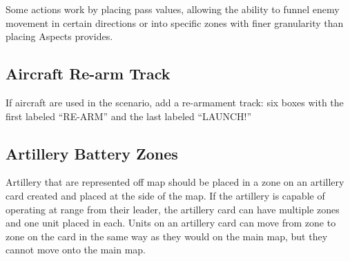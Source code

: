 Some actions work by placing pass values, allowing the ability to funnel enemy movement in certain directions or into specific zones with finer granularity than placing Aspects provides.

\subsection{Aircraft Re-arm Track}\label{sec:Aircraft Re-arm Track}

If aircraft are used in the scenario, add a re-armament track: six
boxes with the first labeled ``RE-ARM'' and the last labeled ``LAUNCH!''

\subsection{Artillery Battery Zones}\label{sec:artillery-battery-zones}

Artillery that are represented off map should be placed in a zone on
an artillery card created and placed at the side of the map. If the
artillery is capable of operating at range from their leader, the
artillery card can have multiple zones and one unit placed in each.
Units on an artillery card can move from zone to zone on the card in
the same way as they would on the main map, but they cannot move onto
the main map.

